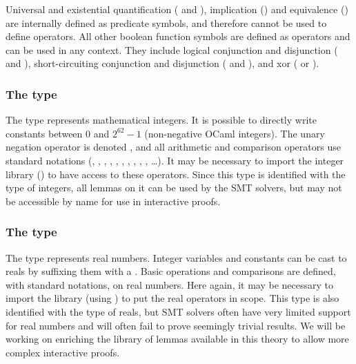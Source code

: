 Universal and existential quantification ( and ),
implication (\rawec{=>}) and equivalence (\rawec{<=>}) are internally defined as
predicate symbols, and therefore cannot be used to define operators. All other
boolean function symbols are defined as operators and can be used in any
context. They include logical conjunction and disjunction (\rawec{/\\} and
\rawec{\\\/}), short-circuiting conjunction and disjunction (\rawec{\&\&} and
\rawec{\|\|}), and xor (\rawec{+} or \rawec{\^\^}).

\subsubsection*{The  type}
The  type represents mathematical integers. It is possible to
directly write constants between $0$ and $2^{62} - 1$ (non-negative OCaml
integers). The unary negation operator is denoted \rawec{-!}, and all arithmetic
and comparison operators use standard notations (\rawec{+}, \rawec{-},
\rawec{*}, \rawec{/}, \rawec{\%}, \rawec{^}, \rawec{=}, \rawec{<}, \rawec{<=},
\rawec{>}, \rawec{>=} \ldots). It may be necessary to import the integer library
() to have access to these operators. Since this type
is identified with the \WhyThree type of integers, all \WhyThree lemmas on it
can be used by the SMT solvers, but may not be accessible by name for use in
interactive proofs.

\subsubsection*{The  type}
The  type represents real numbers. Integer variables and constants
can be cast to reals by suffixing them with a . Basic operations and
comparisons are defined, with standard notations, on real numbers. Here again,
it may be necessary to import the library (using )
to put the real operators in scope. This type is also identified with the
\WhyThree type of reals, but SMT solvers often have very limited support for
real numbers and will often fail to prove seemingly trivial results.
%
We will be working on enriching the library of lemmas available in this theory
to allow more complex interactive proofs.


